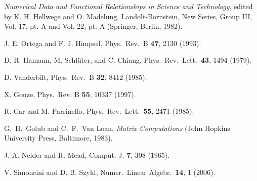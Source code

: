 \documentclass[twocolumn,prb,showpacs,superscriptaddress]{revtex4}
\begin{document}
\begin{thebibliography}{99}
{\it Numerical Data and Functional Relationships in Science and Technology}, 
edited by K. H. Hellwege and O. Madelung, Landolt-B\"ornstein, 
New Series, Group III, Vol. 17, pt. A and Vol. 22, pt. A (Springer, Berlin, 1982).

J. E. Ortega and F. J. Himpsel, 
Phys.\ Rev.\ B {\bf 47}, 2130 (1993).

D. R. Hamann, M. Schl\"uter, and C. Chiang,
Phys.\ Rev.\ Lett.\ {\bf 43}, 1494 (1979).

D. Vanderbilt, 
Phys.\ Rev.\ B {\bf 32}, 8412 (1985).

X. Gonze,
Phys.\ Rev. B {\bf 55}, 10337 (1997).

R. Car and M. Parrinello,
Phys.\ Rev.\ Lett.\ {\bf 55}, 2471 (1985). 

G.\ H.\ Golub and C.\ F.\ Van Loan, {\it Matrix Computations} (John Hopkins University Press, Baltimore, 1983).

J. A. Nelder and R. Mead,
Comput. J. {\bf 7}, 308 (1965).

V. Simoncini and D. B. Szyld,
Numer.\ Linear Algebr.\ {\bf 14}, 1 (2006).

\end{thebibliography}
\end{document}
